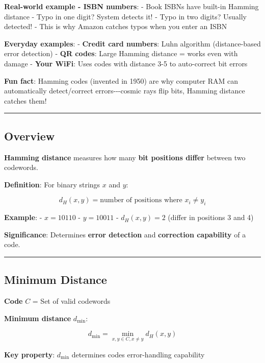 \textbf{Real-world example - ISBN numbers}: - Book ISBNs have built-in
Hamming distance - Typo in one digit? System detects it! - Typo in two
digits? Usually detected! - This is why Amazon catches typos when you
enter an ISBN

\textbf{Everyday examples}: - \textbf{Credit card numbers}: Luhn
algorithm (distance-based error detection) - \textbf{QR codes}: Large
Hamming distance = works even with damage - \textbf{Your WiFi}: Uses
codes with distance 3-5 to auto-correct bit errors

\textbf{Fun fact}: Hamming codes (invented in 1950) are why computer RAM
can automatically detect/correct errors-\/-\/-cosmic rays flip bits,
Hamming distance catches them!

\begin{center}\rule{0.5\linewidth}{0.5pt}\end{center}

\subsection{Overview}\label{overview}

\textbf{Hamming distance} measures how many \textbf{bit positions
differ} between two codewords.

\textbf{Definition}: For binary strings \(x\) and \(y\):

\[
d_H(x, y) = \text{number of positions where } x_i \neq y_i
\]

\textbf{Example}: - \(x = 10110\) - \(y = 10011\) - \(d_H(x, y) = 2\)
(differ in positions 3 and 4)

\textbf{Significance}: Determines \textbf{error detection} and
\textbf{correction capability} of a code.

\begin{center}\rule{0.5\linewidth}{0.5pt}\end{center}

\subsection{Minimum Distance}\label{minimum-distance}

\textbf{Code} \(C\) = Set of valid codewords

\textbf{Minimum distance} \(d_{\min}\):

\[
d_{\min} = \min_{x,y \in C, x \neq y} d_H(x, y)
\]

\textbf{Key property}: \(d_{\min}\) determines code\textquotesingle s
error-handling capability

